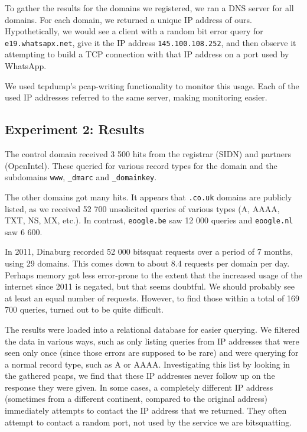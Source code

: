 \documentclass[conference]{IEEEtran}
\begin{document}
To gather the results for the domains we registered, we ran a DNS server for
all domains. For each domain, we returned a unique IP address of ours.
Hypothetically, we would see a client with a random bit error query for
\texttt{e19.whatsapx.net}, give it the IP address \texttt{145.100.108.252}, and
then observe it attempting to build a TCP connection with that IP address on a
port used by WhatsApp.

We used tcpdump's pcap-writing functionality to monitor this usage. Each of the
used IP addresses referred to the same server, making monitoring easier.


\subsection{Experiment 2: Results}\label{sub:exp2r}

The control domain received 3 500 hits from the registrar (SIDN) and partners
(OpenIntel). These queried for various record types for the domain and the
subdomains \texttt{www}, \texttt{\_dmarc} and \texttt{\_domainkey}.

The other domains got many hits. It appears that \texttt{.co.uk} domains are
publicly listed, as we received 52 700 unsolicited queries of various types (A,
AAAA, TXT, NS, MX, etc.). In contrast, \texttt{eoogle.be} saw 12 000 queries
and \texttt{eoogle.nl} saw 6 600.

In 2011, Dinaburg\cite{dinaburg2011bitsquatting} recorded 52 000 bitsquat
requests over a period of 7 months, using 29 domains. This comes down to about
8.4 requests per domain per day. Perhaps memory got less error-prone to the
extent that the increased usage of the internet since 2011 is negated, but that
seems doubtful. We should probably see at least an equal number of requests.
However, to find those within a total of 169 700 queries, turned out to be
quite difficult.

The results were loaded into a relational database for easier querying. We
filtered the data in various ways, such as only listing queries from IP
addresses that were seen only once (since those errors are supposed to be rare)
and were querying for a normal record type, such as A or AAAA. Investigating
this list by looking in the gathered pcaps, we find that these IP addresses
never follow up on the response they were given. In some cases, a completely
different IP address (sometimes from a different continent, compared to the
original address) immediately attempts to contact the IP address that we
returned. They often attempt to contact a random port, not used by the service
we are bitsquatting.
\end{document}
